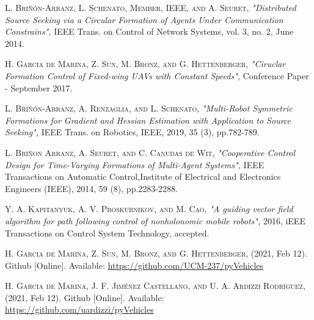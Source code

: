 \newpage
\thispagestyle{empty}
\mbox{}
\begin{thebibliography}{8}

\textsc{L. Briñón-Arranz, L. Schenato, Member, IEEE, and A. Seuret,} 
\textit{"Distributed Source Seeking via a Circular Formation of Agents Under Communication Constrains",} IEEE Trans. on Control of Network Systems, vol. 3, no. 2, June 2014.

\textsc{H. Garcia de Marina, Z. Sun, M. Bronz, and G. Hettenberger,} 
\textit{"Ciruclar Formation Control of Fixed-wing UAVs with Constant Speeds",} Conference Paper - September 2017.

\textsc{L. Briñón-Arranz, A. Renzaglia, and L. Schenato,} 
\textit{"Multi-Robot Symmetric Formations for Gradient and Hessian Estimation with Application to Source Seeking",} IEEE Trans. on Robotics, IEEE, 2019, 35 (3), pp.782-789.

\textsc{L. Briñon Arranz, A. Seuret, and C. Canudas de Wit,} 
\textit{"Cooperative Control Design for Time-Varying Formations of Multi-Agent Systems",} IEEE Transactions on Automatic Control,Institute of Electrical and Electronics Engineers (IEEE), 2014, 59 (8), pp.2283-2288.

\textsc{Y. A. Kapitanyuk, A. V. Proskurnikov, and M. Cao,} 
\textit{"A guiding vector field algorithm for path following control of nonholonomic mobile robots",} 2016, iEEE Transactions on Control System Technology, accepted. 

\textsc{H. Garcia de Marina, Z. Sun, M. Bronz, and G. Hettenberger,} (2021, Feb 12). Github [Online]. Available: \url{https://github.com/UCM-237/pyVehicles}

\textsc{H. Garcia de Marina, J. F. Jiménez Castellano, and U. A. Ardizzi Rodríguez,} (2021, Feb 12). Github [Online]. Available: \url{https://github.com/uardizzi/pyVehicles}

\end{thebibliography}
